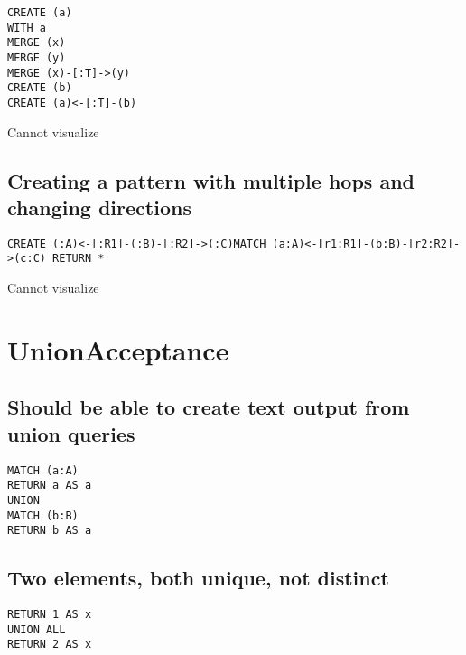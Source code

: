 \begin{lstlisting}
CREATE (a)
WITH a
MERGE (x)
MERGE (y)
MERGE (x)-[:T]->(y)
CREATE (b)
CREATE (a)<-[:T]-(b)
\end{lstlisting}

Cannot visualize
\subsection{Creating a pattern with multiple hops and changing directions}

\begin{lstlisting}
CREATE (:A)<-[:R1]-(:B)-[:R2]->(:C)MATCH (a:A)<-[r1:R1]-(b:B)-[r2:R2]->(c:C) RETURN *
\end{lstlisting}

Cannot visualize
\section{UnionAcceptance}

\subsection{Should be able to create text output from union queries}

\begin{lstlisting}
MATCH (a:A)
RETURN a AS a
UNION
MATCH (b:B)
RETURN b AS a
\end{lstlisting}

\subsection{Two elements, both unique, not distinct}

\begin{lstlisting}
RETURN 1 AS x
UNION ALL
RETURN 2 AS x
\end{lstlisting}

